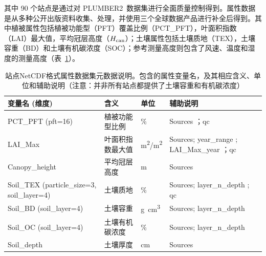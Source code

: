 其中 90 个站点是通过对 PLUMBER2~\citep{ukkola2022flux}数据集进行全面质量控制得到。属性数据是从多种公开出版资料收集、处理，并使用三个全球数据产品进行补全后得到。其中植被属性包括植被功能型（PFT）覆盖比例（PCT\_PFT），叶面积指数
（LAI）最大值，平均冠层高度（$H_{\rm can}$）；土壤属性包括土壤质地（TEX），土壤容重（BD）和土壤有机碳浓度（SOC）；参考测量高度则包含了风速、温度和湿度的测量高度（表~\ref{tab:站点数据元数据}）。

\begin{table}[htbp]
  \begin{threeparttable}
    \centering
    \caption[站点NetCDF格式属性数据集元数据说明]{站点NetCDF格式属性数据集元数据说明。包含的属性变量名，及其相应含义、单位和辅助说明（注意：并非所有站点都提供了土壤容重和有机碳浓度）}
    \label{tab:站点数据元数据}
    \begin{tabular}{p{9.75em}p{10.25em}p{3.5em}p{9.5em}}
      \toprule
      \textbf{变量名 (维度)}                               & \textbf{含义}             & \textbf{单位}  & \textbf{辅助说明}                                            \\
      \midrule
      PCT\_PFT (pft=16)                                    & 植被功能型比例            & \%             & Sources\tnote{a} ；qc                                        \\
      LAI\_Max                                             & 叶面积指数最大值          & \unit{m^2/m^2} & Sources; year\_range\tnote{b} ; LAI\_Max\_year\tnote{c} ；qc \\
      Canopy\_height                                       & 平均冠层高度              & m              & Sources                                                      \\
      Soil\_TEX \newline (particle\_size=3, soil\_layer=4) & 土壤质地                  & \%             & Sources; layer\_n\_depth\tnote{d} ; qc                       \\
      Soil\_BD (soil\_layer=4)                             & 土壤容重                  & \unit{g.cm^3}  & Sources; layer\_n\_depth                                     \\
      Soil\_OC (soil\_layer=4)                             & 土壤有机碳浓度            & \%             & Sources; layer\_n\_depth                                     \\
      Soil\_depth                                          & 土壤厚度                  & cm             & Sources                                                      \\

\end{tabular}
\end{threeparttable}
\end{table}
